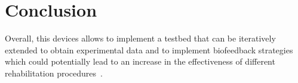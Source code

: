 \documentclass[conference]{IEEEtran}
\begin{document}


\section*{Conclusion}
Overall, this devices allows to implement a testbed that can be iteratively extended to obtain experimental data and to implement biofeedback strategies which could potentially lead to an increase in the effectiveness of different rehabilitation procedures~\cite{Bowman2021}.




%
%
%
\end{document}
